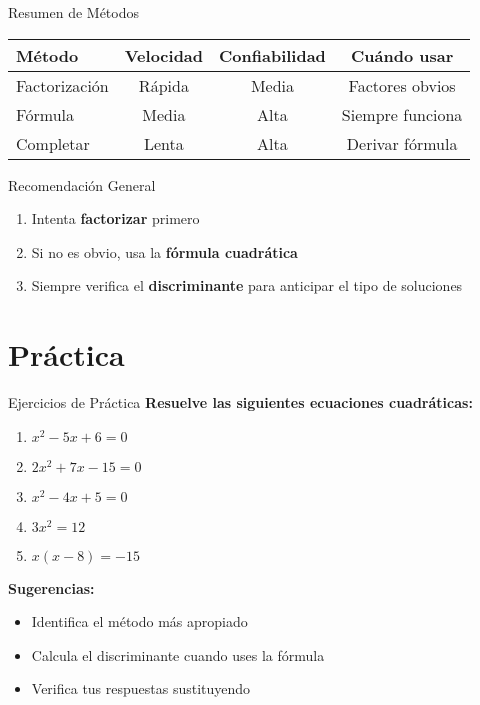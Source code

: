\documentclass[aspectratio=169]{beamer}
\begin{document}
\begin{frame}{Resumen de Métodos}
\begin{table}
\centering
\begin{tabular}{|l|c|c|c|}
\hline
\textbf{Método} & \textbf{Velocidad} & \textbf{Confiabilidad} & \textbf{Cuándo usar} \\
\hline
Factorización & \color{mygreen}Rápida & Media & Factores obvios \\
\hline
Fórmula & Media & \color{mygreen}Alta & Siempre funciona \\
\hline
Completar & Lenta & \color{mygreen}Alta & Derivar fórmula \\
\hline
\end{tabular}
\end{table}

\pause
\vspace{0.5cm}
\begin{block}{Recomendación General}
\begin{enumerate}
\item Intenta \textbf{factorizar} primero
\item Si no es obvio, usa la \textbf{fórmula cuadrática}
\item Siempre verifica el \textbf{discriminante} para anticipar el tipo de soluciones
\end{enumerate}
\end{block}
\end{frame}

\section{Práctica}

\begin{frame}{Ejercicios de Práctica}
\textbf{Resuelve las siguientes ecuaciones cuadráticas:}

\begin{enumerate}
\item $x^2 - 5x + 6 = 0$
\vspace{0.3cm}
\item $2x^2 + 7x - 15 = 0$
\vspace{0.3cm}
\item $x^2 - 4x + 5 = 0$
\vspace{0.3cm}
\item $3x^2 = 12$
\vspace{0.3cm}
\item $x(x - 8) = -15$
\end{enumerate}

\vspace{0.5cm}
\textbf{Sugerencias:}
\begin{itemize}
\item Identifica el método más apropiado
\item Calcula el discriminante cuando uses la fórmula
\item Verifica tus respuestas sustituyendo
\end{itemize}
\end{frame}
\end{document}
